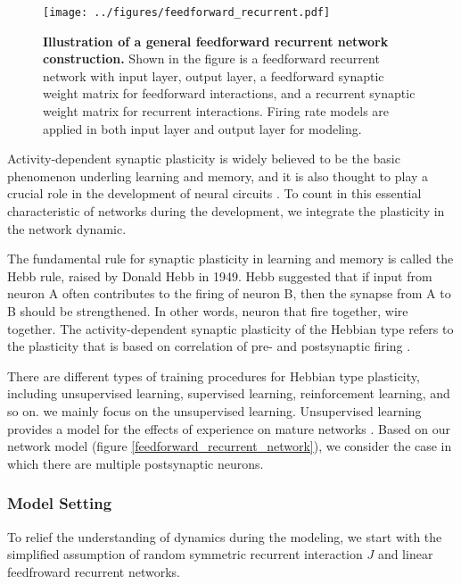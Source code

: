 \documentclass[11pt]{article}
\begin{document}
		\begin{figure}[H]
			\centering
			\texttt{[image: ../figures/feedforward\_recurrent.pdf]}
			\caption{\textbf{Illustration of a general feedforward recurrent network construction.} Shown in the figure is a feedforward recurrent network with input layer, output layer, a feedforward synaptic weight matrix for feedforward interactions, and a recurrent synaptic weight matrix for recurrent interactions. Firing rate models are applied in both input layer and output layer for modeling.}
			\label{fig:feedforward_recurrent_network}
		\end{figure} 
	
	Activity-dependent synaptic plasticity is widely believed to be the basic phenomenon underling learning and memory, and it is also thought to play a crucial role in the development of neural circuits \cite{dayan2005theoretical}. To count in this essential characteristic of networks during the development, we integrate the plasticity in the network dynamic. 
	
	The fundamental rule for synaptic plasticity in learning and memory is called the Hebb rule, raised by Donald Hebb in 1949. Hebb suggested that if input from neuron A often contributes to the firing of neuron B, then the synapse from A to B should be strengthened. In other words, neuron that fire together, wire together. The activity-dependent synaptic plasticity of the Hebbian type refers to the plasticity that is based on correlation of pre- and postsynaptic firing \cite{dayan2005theoretical}. 
	
	There are different types of training procedures for Hebbian type plasticity, including unsupervised learning, supervised learning, reinforcement learning, and so on. we mainly focus on the unsupervised learning. Unsupervised learning provides a model for the effects of experience on mature networks \cite{dayan2005theoretical}. Based on our network model (figure \ref{feedforward_recurrent_network}), we consider the case in which there are multiple postsynaptic neurons. 
	
	\subsubsection{Model Setting}
	To relief the understanding of dynamics during the modeling, we start with the simplified assumption of random symmetric recurrent interaction $J$ and linear feedfroward recurrent networks.
	
\end{document}
